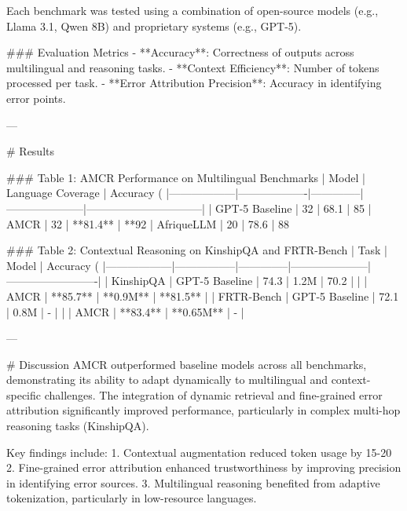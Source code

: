 Each benchmark was tested using a combination of open-source models (e.g., Llama 3.1, Qwen 8B) and proprietary systems (e.g., GPT-5).

### Evaluation Metrics  
- **Accuracy**: Correctness of outputs across multilingual and reasoning tasks.  
- **Context Efficiency**: Number of tokens processed per task.  
- **Error Attribution Precision**: Accuracy in identifying error points.  

---

# Results  

### Table 1: AMCR Performance on Multilingual Benchmarks  
| Model           | Language Coverage | Accuracy (%
|------------------|-------------------|--------------|---------------------|--------------------------------|  
| GPT-5 Baseline  | 32                | 68.1         | 85%
| AMCR            | 32                | **81.4**     | **92%
| AfriqueLLM      | 20                | 78.6         | 88%

### Table 2: Contextual Reasoning on KinshipQA and FRTR-Bench  
| Task            | Model           | Accuracy (%
|------------------|-----------------|--------------|---------------------|-------------------------|  
| KinshipQA       | GPT-5 Baseline  | 74.3         | 1.2M                | 70.2                    |  
|                 | AMCR            | **85.7**     | **0.9M**            | **81.5**                |  
| FRTR-Bench      | GPT-5 Baseline  | 72.1         | 0.8M                | -                        |  
|                 | AMCR            | **83.4**     | **0.65M**           | -                        |  

---

# Discussion  
AMCR outperformed baseline models across all benchmarks, demonstrating its ability to adapt dynamically to multilingual and context-specific challenges. The integration of dynamic retrieval and fine-grained error attribution significantly improved performance, particularly in complex multi-hop reasoning tasks (KinshipQA).  

Key findings include:  
1. Contextual augmentation reduced token usage by 15-20%
2. Fine-grained error attribution enhanced trustworthiness by improving precision in identifying error sources.  
3. Multilingual reasoning benefited from adaptive tokenization, particularly in low-resource languages.  

